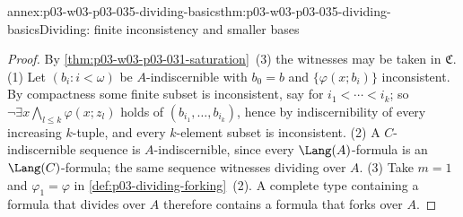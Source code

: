 \begin{annexitem}{annex:p03-w03-p03-035-dividing-basics}{thm:p03-w03-p03-035-dividing-basics}{Dividing: finite inconsistency and smaller bases}
\begin{proof}
By \cref{thm:p03-w03-p03-031-saturation}~(3) the witnesses may be taken in
\(\mathfrak C\).
(1) Let \((b_i:i<\omega)\) be \(A\)-indiscernible with \(b_0=b\) and
\(\{\varphi(x;b_i)\}\) inconsistent.  By compactness some finite subset is
inconsistent, say for \(i_1<\cdots<i_k\); so
\(\neg\exists x\bigwedge_{l\leq k}\varphi(x;z_l)\) holds of
\((b_{i_1},\ldots,b_{i_k})\), hence by indiscernibility of every increasing
\(k\)-tuple, and every \(k\)-element subset is inconsistent.
(2) A \(C\)-indiscernible sequence is \(A\)-indiscernible, since every
\(\Lang(A)\)-formula is an \(\Lang(C)\)-formula; the same sequence witnesses
dividing over \(A\).
(3) Take \(m=1\) and \(\varphi_1=\varphi\) in
\cref{def:p03-dividing-forking}~(2).  A complete type containing a formula that
divides over \(A\) therefore contains a formula that forks over \(A\).
\end{proof}
\end{annexitem}


